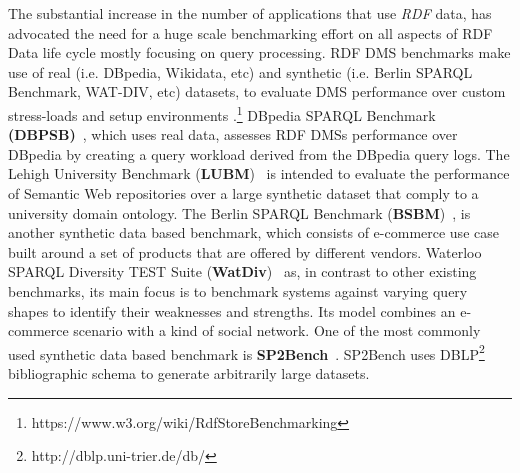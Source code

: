 \documentclass{llncs}
\begin{document}
    The substantial increase in the number of applications that use \textit{RDF} data, has advocated the need for a huge scale benchmarking effort on all aspects of RDF Data life cycle mostly focusing on query processing\cite{ngomo2016hobbit}.
    RDF DMS benchmarks make use of real (i.e. DBpedia, Wikidata, etc) and synthetic (i.e. Berlin SPARQL Benchmark, WAT-DIV, etc) datasets, to evaluate DMS performance over custom stress-loads and setup environments \cite{fineeval}.\footnote{https://www.w3.org/wiki/RdfStoreBenchmarking}
    DBpedia SPARQL Benchmark \textbf{(DBPSB)}~\cite{Morsey2011}, which uses real data, assesses RDF DMSs performance over DBpedia by creating a query workload derived from the DBpedia query logs. 
    The Lehigh University Benchmark (\textbf{LUBM})~\cite{Guo:2005:LBO:1741305.1741322} is intended to evaluate the performance of Semantic Web repositories over a large synthetic dataset that comply to a university domain ontology.
    The Berlin SPARQL Benchmark (\textbf{BSBM})~\cite{Bizer2009TheBS}, is another synthetic data based benchmark, which consists of e-commerce use case built around a set of products that are offered by different vendors.
    Waterloo SPARQL Diversity TEST Suite (\textbf{WatDiv})~\cite{alucc2014diversified} as, in contrast to other existing benchmarks, its main focus is to benchmark systems against varying query shapes to identify their weaknesses and strengths.
    Its model combines an e-commerce scenario with a kind of social network.
    One of the most commonly used synthetic data based benchmark is \textbf{SP2Bench}~\cite{books/sp/virgilio09/SchmidtHMPL09}. 
    SP2Bench uses DBLP\footnote{http://dblp.uni-trier.de/db/} bibliographic schema to generate arbitrarily large datasets. 
   
\end{document}
